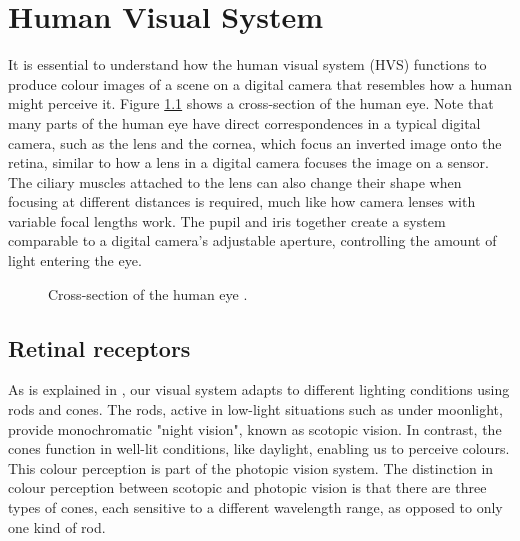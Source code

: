 \chapter{Human Visual System}%
\label{ch:hvs}

It is essential to understand how the human visual system (HVS) functions to produce colour images of a scene on a digital camera that resembles how a human might perceive it. Figure \ref{fig:humaneye} shows a cross-section of the human eye. Note that many parts of the human eye have direct correspondences in a typical digital camera, such as the lens and the cornea, which focus an inverted image onto the retina, similar to how a lens in a digital camera focuses the image on a sensor. The ciliary muscles attached to the lens can also change their shape when focusing at different distances is required, much like how camera lenses with variable focal lengths work. The pupil and iris together create a system comparable to a digital camera's adjustable aperture, controlling the amount of light entering the eye.

\begin{figure}
    \centering
    \caption{Cross-section of the human eye \cite{humaneye}.}
    \label{fig:humaneye}
\end{figure}

\section{Retinal receptors}

As is explained in \cite[4-5]{measuringcolour}, our visual system adapts to different lighting conditions using rods and cones. The rods, active in low-light situations such as under moonlight, provide monochromatic "night vision", known as scotopic vision. In contrast, the cones function in well-lit conditions, like daylight, enabling us to perceive colours. This colour perception is part of the photopic vision system. The distinction in colour perception between scotopic and photopic vision is that there are three types of cones, each sensitive to a different wavelength range, as opposed to only one kind of rod.

